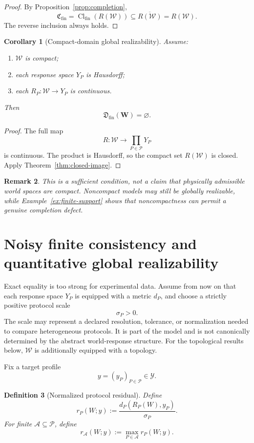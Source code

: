 \documentclass[11pt]{article}
\newtheorem{definition}{Definition}[section]
\newtheorem{corollary}[definition]{Corollary}
\newtheorem{remark}[definition]{Remark}
\newcommand{\W}{\mathcal W}
\newcommand{\Pcal}{\mathcal P}
\newcommand{\Acal}{\mathcal A}
\newcommand{\Y}{\mathcal Y}
\newcommand{\Cfin}{\mathfrak C_{\mathrm{fin}}}
\newcommand{\Dfin}{\mathfrak D_{\mathrm{fin}}}
\begin{document}
\begin{proof}
By Proposition~\ref{prop:completion},
\[
\Cfin=\operatorname{Cl}_{\mathrm{fin}}(R(\W))
\subseteq
\overline{R(\W)}
=
R(\W).
\]
The reverse inclusion always holds.
\end{proof}

\begin{corollary}[Compact-domain global realizability]\label{cor:compact}
Assume:
\begin{enumerate}[label=(\roman*)]
\item $\W$ is compact;
\item each response space $Y_P$ is Hausdorff;
\item each $R_P:\W\to Y_P$ is continuous.
\end{enumerate}
Then
\[
\Dfin(\mathbf W)=\varnothing.
\]
\end{corollary}

\begin{proof}
The full map
\[
R:\W\to\prod_{P\in\Pcal}Y_P
\]
is continuous. The product is Hausdorff, so the compact set $R(\W)$ is closed.
Apply Theorem~\ref{thm:closed-image}.
\end{proof}

\begin{remark}
This is a sufficient condition, not a claim that physically admissible world
spaces are compact. Noncompact models may still be globally realizable, while
Example~\ref{ex:finite-support} shows that noncompactness can permit a genuine
completion defect.
\end{remark}


\section{Noisy finite consistency and quantitative global realizability}

Exact equality is too strong for experimental data. Assume from now on that
each response space $Y_P$ is equipped with a metric $d_P$, and choose a
strictly positive protocol scale
\[
\sigma_P>0.
\]
The scale may represent a declared resolution, tolerance, or normalization
needed to compare heterogeneous protocols. It is part of the model and is not
canonically determined by the abstract world-response structure. For the
topological results below, $\W$ is additionally equipped with a topology.

Fix a target profile
\[
y=(y_P)_{P\in\Pcal}\in\Y.
\]

\begin{definition}[Normalized protocol residual]
Define
\[
r_P(W;y)
:=
\frac{d_P(R_P(W),y_P)}{\sigma_P}.
\]
For finite $\Acal\subseteq\Pcal$, define
\[
r_{\Acal}(W;y)
:=
\max_{P\in\Acal}r_P(W;y).
\]
\end{definition}
\end{document}
